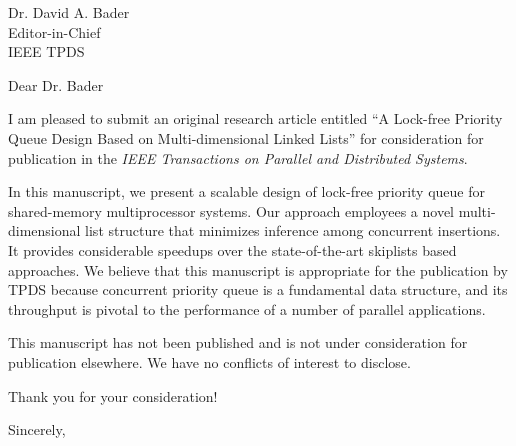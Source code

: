 \documentclass[letterpaper, 10pt]{letter}
\begin{document}
\begin{letter}{Dr. David A. Bader\\Editor-in-Chief\\IEEE TPDS}
    \opening{Dear Dr. Bader}
    I am pleased to submit an original research article entitled ``A Lock-free Priority Queue Design Based on Multi-dimensional Linked Lists'' for consideration for publication in the \emph{IEEE Transactions on Parallel and Distributed Systems}.

    In this manuscript, we present a scalable design of lock-free priority queue for shared-memory multiprocessor systems.  
    Our approach employees a novel multi-dimensional list structure that minimizes inference among concurrent insertions.
    It provides considerable speedups over the state-of-the-art skiplists based approaches.
    We believe that this manuscript is appropriate for the publication by TPDS because concurrent priority queue is a fundamental data structure, and its throughput is pivotal to the performance of a number of parallel applications.

    This manuscript has not been published and is not under consideration for publication elsewhere. 
    We have no conflicts of interest to disclose. 

    Thank you for your consideration!
    \closing{Sincerely,}
\end{letter}
\end{document}
